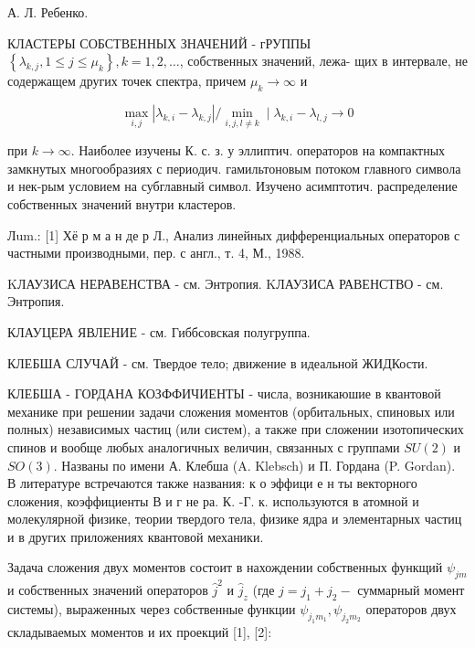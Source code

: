 \documentclass[10pt]{article}
\begin{document}
А. Л. Ребенко.



КЛАСТЕРЫ СОБСТВЕННЫХ ЗНАЧЕНИЙ - гРУППЫ $\left\{\lambda_{k, j}, 1 \leqslant j \leqslant \mu_{k}\right\}, k=1,2, \ldots$, собственных значений, лежа- щих в интервале, не содержащем других точек спектра, причем $\mu_{k} \rightarrow \infty$ и



\[

\max _{i, j}\left|\lambda_{k, i}-\lambda_{k, j}\right| / \min _{i, j, l \neq k} \mid \lambda_{k, i}-\lambda_{l, j} \rightarrow 0

\]



при $k \rightarrow \infty$. Наиболее изучены К. с. з. у эллиптич. операторов на компактных замкнутых многообразиях с периодич. гамильтоновым потоком главного символа и нек-рым условием на субглавный символ. Изучено асимптотич. распределение собственных значений внутри кластеров.



Лum.: [1] Хё р м а н де р Л., Анализ линейных дифференциальных операторов с частными производными, пер. с англ., т. 4, М., 1988.



KЛАУЗИСА НЕРАВЕНСТВА - см. Энтропия. KЛАУЗИСА РАВЕНСТВО - см. Энтропия.



КЛАУЦЕРА ЯВЛЕНИЕ - см. Гиббсовская полугруппа.



КЛЕБША СЛУЧАЙ - см. Твердое тело; движение в идеальной ЖИДКости.



КЛЕБША - ГОРДАНА КОЗФФИЧИЕНТЫ - числа, возникаюшие в квантовой механике при решении задачи сложения моментов (орбитальных, спиновых или полных) независимых частиц (или систем), а также при сложении изотопических спинов и вообще любых аналогичных величин, связанных с группами $S U(2)$ и $S O(3)$. Названы по имени А. Клебша (A. Klebsch) и П. Гордана (P. Gordan). В литературе встречаются также названия: к о эффици е н ты векторного сложения, коэффициенты В и г не ра. К. -Г. к. используются в атомной и молекулярной физике, теории твердого тела, физике ядра и элементарных частиц и в других приложениях квантовой механики.



Задача сложения двух моментов состоит в нахождении собственных функщий $\psi_{j m}$ и собственных значений операторов $\hat{j}^{2}$ и $\hat{j}_{z}$ (где $j=j_{1}+j_{2}-$ суммарный момент системы), выраженных через собственные функции $\psi_{j_{1} m_{1}}, \psi_{j_{2} m_{2}}$ операторов двух складываемых моментов и их проекций [1], [2]:
\end{document}
